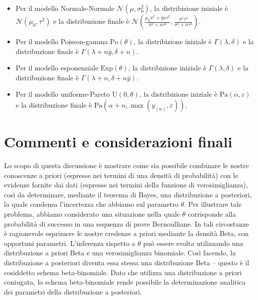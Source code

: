 \documentclass[
  11pt,
]{krantz}
\providecommand{\tightlist}{%
  \setlength{\itemsep}{0pt}\setlength{\parskip}{0pt}}
\theoremstyle{definition}
\theoremstyle{definition}
\theoremstyle{definition}
\theoremstyle{definition}
\theoremstyle{remark}
\begin{document}
\begin{itemize}
\tightlist
\item
  Per il modello Normale-Normale \(\mathcal{N}(\mu, \sigma^2_0)\), la distribizione iniziale è \(\mathcal{N}(\mu_0, \tau^2)\) e la distribuzione finale è \(\mathcal{N}\left(\frac{\mu_0\sigma^2 + \bar{y}n\tau^2}{\sigma^2 + n\tau^2}, \frac{\sigma^2\tau^2}{\sigma^2 + n\tau^2} \right)\).
\item
  Per il modello Poisson-gamma \(\text{Po}(\theta)\), la distribizione iniziale è \(\Gamma(\lambda, \delta)\) e la distribuzione finale è \(\Gamma(\lambda + n \bar{y}, \delta +n)\).
\item
  Per il modello esponenziale \(\text{Exp}(\theta)\), la distribizione iniziale è \(\Gamma(\lambda, \delta)\) e la distribuzione finale è \(\Gamma(\lambda + n, \delta +n\bar{y})\).
\item
  Per il modello uniforme-Pareto \(\text{U}(0, \theta)\), la distribizione iniziale è \(\mbox{Pa}(\alpha, \varepsilon)\) e la distribuzione finale è \(\mbox{Pa}(\alpha + n, \max(y_{(n)}, \varepsilon))\).
\end{itemize}

\hypertarget{commenti-e-considerazioni-finali-1}{%
\section*{Commenti e considerazioni finali}\label{commenti-e-considerazioni-finali-1}}


Lo scopo di questa discussione è mostrare come sia possibile combinare le nostre conoscenze a priori (espresse nei termini di una densità di probabilità) con le evidenze fornite dai dati (espresse nei termini della funzione di verosimiglianza), così da determinare, mediante il teorema di Bayes, una distribuzione a posteriori, la quale condensa l'incertezza che abbiamo sul parametro \(\theta\). Per illustrare tale problema, abbiamo considerato una situazione nella quale \(\theta\) corrisponde alla probabilità di successo in una sequenza di prove Bernoulliane. In tali circostanze è ragionevole esprimere le nostre credenze a priori mediante la densità Beta, con opportuni parametri. L'inferenza rispetto a \(\theta\) può essere svolta utilizzando una distribuzione a priori Beta e una verosimiglianza binomiale. Così facendo, la distribuzione a posteriori diventa essa stessa una distribuzione Beta -- questo è il cosiddetto schema beta-binomiale. Dato che utilizza una distribuzione a priori coniugata, lo schema beta-binomiale rende possibile la determinazione analitica dei parametri della distribuzione a posteriori.
\end{document}
